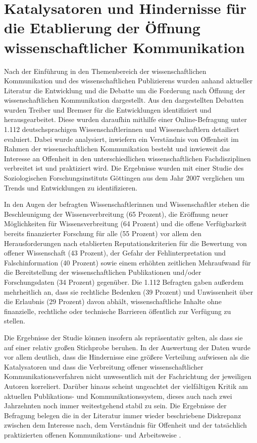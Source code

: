 \section{Katalysatoren und Hindernisse für die Etablierung der Öffnung wissenschaftlicher Kommunikation}

Nach der Einführung in den Themenbereich der wissenschaftlichen Kommunikation und des wissenschaftlichen Publizierens wurden anhand aktueller Literatur die Entwicklung und die Debatte um die Forderung nach Öffnung der wissenschaftlichen Kommunikation dargestellt. Aus den dargestellten Debatten wurden Treiber und Bremser für die Entwicklungen identifiziert und herausgearbeitet. Diese wurden daraufhin mithilfe einer Online-Befragung unter 1.112 deutschsprachigen Wissenschaftlerinnen und Wissenschaftlern detailiert evaluiert. Dabei wurde analysiert, inwiefern ein Verständnis von Offenheit im Rahmen der wissenschaftlichen Kommunikation besteht und inwieweit das Interesse an Offenheit in den unterschiedlichen wissenschaftlichen Fachdisziplinen verbreitet ist und praktiziert wird. Die Ergebnisse wurden mit einer Studie des Soziologischen Forschungsinstituts Göttingen aus dem Jahr 2007 verglichen um Trends und Entwicklungen zu identifizieren.

In den Augen der befragten Wissenschaftlerinnen und Wissenschaftler stehen die Beschleunigung der Wissensverbreitung (65 Prozent), die Eröffnung neuer Möglichkeiten für Wissensverbreitung (64 Prozent) und die offene Verfügbarkeit bereits finanzierter Forschung für alle (55 Prozent) vor allem den Herausforderungen nach etablierten Reputationskriterien für die Bewertung von offener Wissenschaft (43 Prozent), der Gefahr der Fehlinterpretation und Falschinformation (40 Prozent) sowie einem erhöhten zeitlichen Mehraufwand für die Bereitstellung der wissenschaftlichen Publikationen und/oder Forschungsdaten (34 Prozent) gegenüber. Die 1.112 Befragten gaben außerdem mehrheitlich an, dass sie rechtliche Bedenken (39 Prozent) und Unwissenheit über die Erlaubnis (29 Prozent) davon abhält, wissenschaftliche Inhalte ohne finanzielle, rechtliche oder technische Barrieren öffentlich zur Verfügung zu stellen.

Die Ergebnisse der Studie können insofern als repräsentativ gelten, als dass sie auf einer relativ großen Stichprobe beruhen. In der Auswertung der Daten wurde vor allem deutlich, dass die Hindernisse eine größere Verteilung aufwiesen als die Katalysatoren und dass die Verbreitung offener wissenschaftlicher Kommunikationsverfahren nicht unwesentlich mit der Fachrichtung der jeweiligen Autoren korreliert. Darüber hinaus scheint ungeachtet der vielfältigen Kritik am aktuellen Publikations- und Kommunikationssystem, dieses auch nach zwei Jahrzehnten noch immer weitestgehend stabil zu sein. Die Ergebnisse der Befragung belegen die in der Literatur immer wieder beschriebene Diskrepanz zwischen dem Interesse nach, dem Verständnis für Offenheit und der tatsächlich praktizierten offenen Kommunikations- und Arbeitsweise \cite{yiotis_2013_open} \cite{Bartling_2013} \cite{hagner_2015_sache_buches} \cite{Fecher_2015}.

